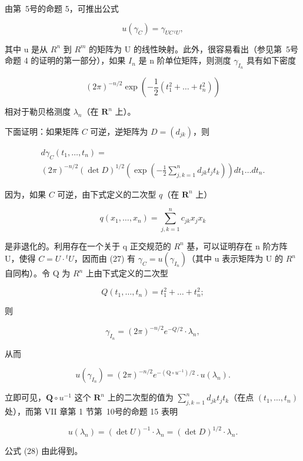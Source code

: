 由第~5号的命题 5，可推出公式

\[
u (\gamma_ {C}) = \gamma_{U C\,{}^{t}U}  ,\tag{27}
\]

其中 u 是从 \(R^{n}\) 到 \(R^{m}\) 的矩阵为 U 的线性映射。此外，很容易看出（参见第~5号命题 4 的证明的第一部分），如果 \(I_{n}\) 是 n 阶单位矩阵，则测度 \(\gamma_{I_{n}}\) 具有如下密度

\[
(2 \pi) ^ {- n / 2} \exp \left(- \frac {1}{2} (t _ {1} ^ {2} + \dots + t _ {n} ^ {2})\right)
\]

 相对于勒贝格测度 \(\lambda_{n}\)（在 \(\mathbf{R}^{n}\) 上）。

下面证明：如果矩阵 \(C\) 可逆，逆矩阵为 \(D = (d_{jk})\)，则

\[
\begin{array}{l} d \gamma_ {C} (t _ {1}, \dots , t _ {n}) = \\ (2 \pi) ^ {- n / 2} (\det D) ^ {1 / 2} \left(\exp \left(- \frac {1}{2} \sum_ {j, k = 1} ^ {n} d _ {j k} t _ {j} t _ {k}\right)\right) d t _ {1} \dots d t _ {n}. \end{array}\tag{28}
\]

 因为，如果 \(C\) 可逆，由下式定义的二次型 \(q\)（在 \(\mathbf{R}^n\) 上）

\[
q (x _ {1}, \dots , x _ {n}) = \sum_ {j, k = 1} ^ {n} c _ {j k} x _ {j} x _ {k}
\]

是非退化的。利用存在一个关于 q 正交规范的 \(R^{n}\) 基，可以证明存在 n 阶方阵 U，使得 \(C = U \cdot {}^{t}U\)，因而由 (27) 有 \(\gamma_{C} = u(\gamma_{I_{n}})\)（其中 u 表示矩阵为 U 的 \(R^{n}\) 自同构）。令 Q 为 \(R^{n}\) 上由下式定义的二次型

\[
Q (t _ {1}, \dots , t _ {n}) = t _ {1} ^ {2} + \dots + t _ {n} ^ {2};
\]

则

\[
\gamma_ {I _ {n}} = (2 \pi) ^ {- n / 2} e ^ {- Q / 2} \cdot \lambda_ {n},
\]

从而

\[
u (\gamma_ {I _ {n}}) = (2 \pi) ^ {- n / 2} e ^ {- (\mathrm{Q} \circ u ^ {- 1}) / 2} \cdot u (\lambda_ {n}).\tag{29}
\]

立即可见，\(\mathbf{Q} \circ u^{-1}\) 这个 \(\mathbf{R}^n\) 上的二次型的值为 \(\sum_{j,k=1}^{n} d_{jk} t_j t_k\)（在点 \((t_1, \ldots, t_n)\) 处），而第 VII 章第 1 节第~10号的命题 15 表明

\[
u (\lambda_ {n}) = (\det U) ^ {- 1} \cdot \lambda_ {n} = (\det D) ^ {1 / 2} \cdot \lambda_ {n}.\tag{30}
\]

公式 (28) 由此得到。

